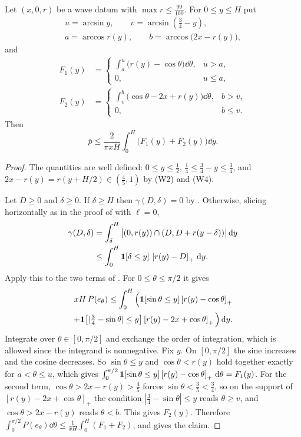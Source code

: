 \documentclass[11pt,colorlinks]{charlie}
\newcommand{\pos}[1]{\left[#1\right]_+}
\begin{document}
\begin{proposition}\label{prop:heightbound}
Let $(x,0,r)$ be a wave datum with $\max r\le\tfrac{99}{100}$. For $0\le y\le H$ put
\begin{gather*}
 u=\arcsin y,\qquad v=\arcsin(\tfrac34-y),\\
 a=\arccos r(y),\qquad b=\arccos\big(2x-r(y)\big),
\end{gather*}
and
\begin{align*}
 F_1(y)&=\begin{cases}\displaystyle\int_a^u\big(r(y)-\cos\theta\big)\dd\theta,&u>a,\\[1ex] 0,&u\le a,\end{cases}\\
 F_2(y)&=\begin{cases}\displaystyle\int_v^b\big(\cos\theta-2x+r(y)\big)\dd\theta,&b>v,\\[1ex] 0,&b\le v.\end{cases}
\end{align*}
Then
\[
 \bar p\le\frac{2}{\pi xH}\int_0^H\big(F_1(y)+F_2(y)\big)\dd y .
\]
\end{proposition}

\begin{proof}
The quantities are well defined: $0\le y\le\tfrac12$, $\tfrac14\le\tfrac34-y\le\tfrac34$, and $2x-r(y)=r(y+H/2)\in(\tfrac45,1)$ by (W2) and (W4).

Let $D\ge0$ and $\delta\ge0$. If $\delta\ge H$ then $\gamma(D,\delta)=0$ by . Otherwise, slicing horizontally as in the proof of  with $\ell=0$,
\begin{align*}
 \gamma(D,\delta)&=\int_\delta^H\big|(0,r(y))\cap(D,D+r(y-\delta))\big|\dd y\\
 &\le\int_0^H\one[\delta\le y]\,\pos{r(y)-D}\dd y .
\end{align*}
Apply this to the two terms of . For $0\le\theta\le\pi/2$ it gives
\begin{multline*}
 xH\,P(e_\theta)\le\int_0^H\Big(\one[\sin\theta\le y]\pos{r(y)-\cos\theta}\\
 +\one\big[|\tfrac34-\sin\theta|\le y\big]\pos{r(y)-2x+\cos\theta}\Big)\dd y .
\end{multline*}
Integrate over $\theta\in[0,\pi/2]$ and exchange the order of integration, which is allowed since the integrand is nonnegative. Fix $y$. On $[0,\pi/2]$ the sine increases and the cosine decreases. So $\sin\theta\le y$ and $\cos\theta<r(y)$ hold together exactly for $a<\theta\le u$, which gives $\int_0^{\pi/2}\one[\sin\theta\le y]\pos{r(y)-\cos\theta}\dd\theta=F_1(y)$. For the second term, $\cos\theta>2x-r(y)>\tfrac45$ forces $\sin\theta<\tfrac35<\tfrac34$, so on the support of $\pos{r(y)-2x+\cos\theta}$ the condition $|\tfrac34-\sin\theta|\le y$ reads $\theta\ge v$, and $\cos\theta>2x-r(y)$ reads $\theta<b$. This gives $F_2(y)$. Therefore $\int_0^{\pi/2}P(e_\theta)\dd\theta\le\frac{1}{xH}\int_0^H(F_1+F_2)$, and  gives the claim.
\end{proof}
\end{document}
